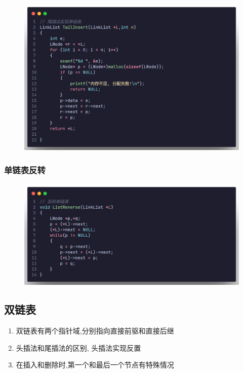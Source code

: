 \begin{figure}[H]
    \centering
    \includegraphics[scale=0.2]{"figure/Note/LinearList/SlTInsert.png"}
\end{figure}

\subsubsection{单链表反转}

\begin{figure}[H]
    \centering
    \includegraphics[scale=0.2]{"figure/Note/LinearList/SlReverse.png"}
\end{figure}



\subsection{双链表}
\begin{definition}[双链表]
    \begin{enumerate}
        \item 双链表有两个指针域,分别指向直接前驱和直接后继
        \item 头插法和尾插法的区别, 头插法实现反置
        \item 在插入和删除时,第一个和最后一个节点有特殊情况
    \end{enumerate}
\end{definition}

